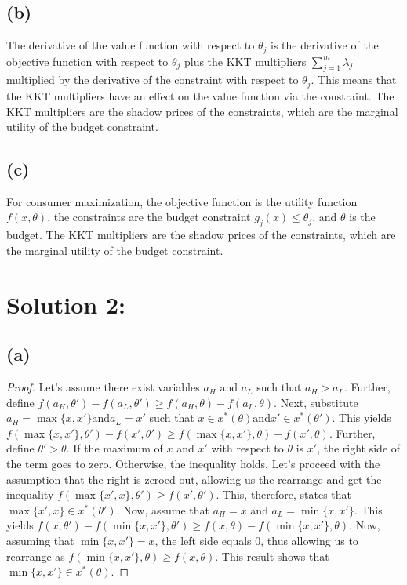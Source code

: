 \documentclass[10pt, a4paper]{article}
\begin{document}
    \subsection*{(b)}
        The derivative of the value function with respect to $\theta_j$ is the derivative of the objective function with respect to $\theta_j$ plus the KKT multipliers $\sum\limits_{j=1}^m\lambda_j$
        multiplied by the derivative of the constraint with respect to $\theta_j$. This means that the KKT multipliers have an effect on the value function via the constraint. The KKT multipliers are
        the shadow prices of the constraints, which are the marginal utility of the budget constraint.
    \subsection*{(c)}
        For consumer maximization, the objective function is the utility function $f(x,\theta)$, the constraints are the budget constraint $g_j(x)\leq\theta_j$, and $\theta$ is the budget. The KKT multipliers
        are the shadow prices of the constraints, which are the marginal utility of the budget constraint.
\section*{Solution 2:}
    \subsection*{(a)}
        \begin{proof}
          Let's assume there exist variables $a_H$ and $a_L$ such that $a_H > a_L$. Further, define $f(a_H,\theta') - f(a_L,\theta') \geq f(a_H,\theta)-f(a_L,\theta)$. Next, substitute
          $a_H = \max\{x,x'\} \text{and} a_L = x'$ such that $x\in x^*(\theta) \text{and} x'\in x^*(\theta')$. This yields $f(\max\{x,x'\},\theta') - f(x',\theta') \geq f(\max\{x,x'\},\theta) - f(x',\theta)$.
          Further, define $\theta'>\theta$. If the maximum of $x$ and $x'$ with respect to $\theta$ is $x'$, the right side of the term goes to zero. Otherwise, the inequality holds. Let's
          proceed with the assumption that the right is zeroed out, allowing us the rearrange and get the inequality $f(\max\{x',x\},\theta')\geq f(x',\theta')$. This, therefore, states that 
          $\max\{x',x\} \in x^*(\theta')$. Now, assume that $a_H = x$ and $a_L = \min\{x,x'\}$. This yields $f(x,\theta') - f(\min\{x,x'\},\theta') \geq f(x,\theta) - f(\min\{x,x'\},\theta)$. 
          Now, assuming that $\min\{x,x'\} = x$, the left side equals 0, thus allowing us to rearrange as $f(\min\{x,x'\},\theta)\geq f(x,\theta)$. This result shows that $\min\{x,x'\}\in x^*(\theta)$.
      \end{proof}
\end{document}
